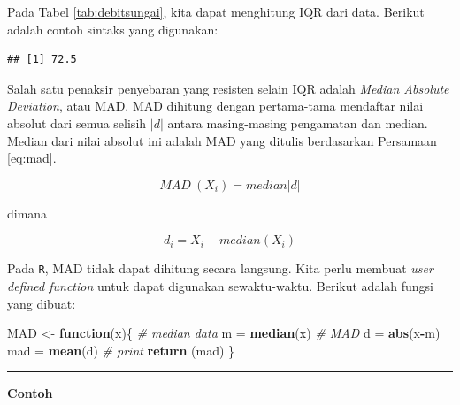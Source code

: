 \documentclass[]{book}
\newenvironment{Shaded}{\begin{snugshade}}{\end{snugshade}}
\newcommand{\KeywordTok}[1]{\textcolor[rgb]{0.13,0.29,0.53}{\textbf{#1}}}
\newcommand{\StringTok}[1]{\textcolor[rgb]{0.31,0.60,0.02}{#1}}
\newcommand{\CommentTok}[1]{\textcolor[rgb]{0.56,0.35,0.01}{\textit{#1}}}
\newcommand{\ControlFlowTok}[1]{\textcolor[rgb]{0.13,0.29,0.53}{\textbf{#1}}}
\newcommand{\OperatorTok}[1]{\textcolor[rgb]{0.81,0.36,0.00}{\textbf{#1}}}
\newcommand{\NormalTok}[1]{#1}
\begin{document}
Pada Tabel \ref{tab:debitsungai}, kita dapat menghitung IQR dari data.
Berikut adalah contoh sintaks yang digunakan:

\begin{Shaded}
\end{Shaded}

\begin{verbatim}
## [1] 72.5
\end{verbatim}

Salah satu penaksir penyebaran yang resisten selain IQR adalah
\emph{Median Absolute Deviation}, atau MAD. MAD dihitung dengan
pertama-tama mendaftar nilai absolut dari semua selisih \(|d|\) antara
masing-masing pengamatan dan median. Median dari nilai absolut ini
adalah MAD yang ditulis berdasarkan Persamaan \eqref{eq:mad}.

\begin{equation}
  MAD\ \left(X_i\right)=median\left|d\right|
  \label{eq:mad}
\end{equation}

dimana

\begin{equation}
  d_i=X_i-median\left(X_i\right)
  \label{eq:mad2}
\end{equation}

Pada \texttt{R}, MAD tidak dapat dihitung secara langsung. Kita perlu
membuat \emph{user defined function} untuk dapat digunakan
sewaktu-waktu. Berikut adalah fungsi yang dibuat:

\begin{Shaded}
\begin{Highlighting}[]
\NormalTok{MAD <-}\StringTok{ }\ControlFlowTok{function}\NormalTok{(x)\{}
  \CommentTok{# median data}
\NormalTok{  m =}\StringTok{ }\KeywordTok{median}\NormalTok{(x)}
  \CommentTok{# MAD}
\NormalTok{  d =}\StringTok{ }\KeywordTok{abs}\NormalTok{(x}\OperatorTok{-}\NormalTok{m)}
\NormalTok{  mad =}\StringTok{ }\KeywordTok{mean}\NormalTok{(d)}
  \CommentTok{# print}
  \KeywordTok{return}\NormalTok{ (mad)}
\NormalTok{\}}
\end{Highlighting}
\end{Shaded}

\begin{center}\rule{0.5\linewidth}{\linethickness}\end{center}

\textbf{Contoh}
\end{document}
